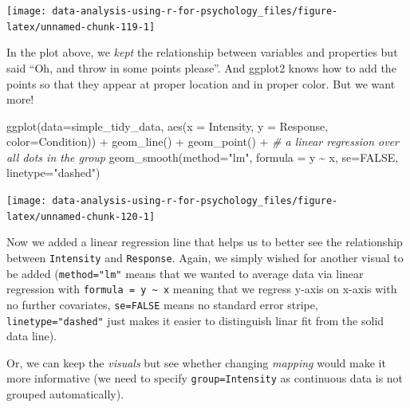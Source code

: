 \documentclass[
]{book}
\newenvironment{Shaded}{\begin{snugshade}}{\end{snugshade}}
\newcommand{\AttributeTok}[1]{\textcolor[rgb]{0.77,0.63,0.00}{#1}}
\newcommand{\CommentTok}[1]{\textcolor[rgb]{0.56,0.35,0.01}{\textit{#1}}}
\newcommand{\ConstantTok}[1]{\textcolor[rgb]{0.00,0.00,0.00}{#1}}
\newcommand{\FunctionTok}[1]{\textcolor[rgb]{0.00,0.00,0.00}{#1}}
\newcommand{\NormalTok}[1]{#1}
\newcommand{\SpecialCharTok}[1]{\textcolor[rgb]{0.00,0.00,0.00}{#1}}
\newcommand{\StringTok}[1]{\textcolor[rgb]{0.31,0.60,0.02}{#1}}
\begin{document}
\begin{center}\texttt{[image: data-analysis-using-r-for-psychology\_files/figure-latex/unnamed-chunk-119-1]} \end{center}

In the plot above, we \emph{kept} the relationship between variables and properties but said ``Oh, and throw in some points please''. And ggplot2 knows how to add the points so that they appear at proper location and in proper color. But we want more!

\begin{Shaded}
\begin{Highlighting}[]
\FunctionTok{ggplot}\NormalTok{(}\AttributeTok{data=}\NormalTok{simple\_tidy\_data, }\FunctionTok{aes}\NormalTok{(}\AttributeTok{x =}\NormalTok{ Intensity, }\AttributeTok{y =}\NormalTok{ Response, }\AttributeTok{color=}\NormalTok{Condition)) }\SpecialCharTok{+} 
  \FunctionTok{geom\_line}\NormalTok{() }\SpecialCharTok{+}
  \FunctionTok{geom\_point}\NormalTok{() }\SpecialCharTok{+}
  \CommentTok{\# a linear regression over all dots in the group}
  \FunctionTok{geom\_smooth}\NormalTok{(}\AttributeTok{method=}\StringTok{"lm"}\NormalTok{, }\AttributeTok{formula =}\NormalTok{ y }\SpecialCharTok{\textasciitilde{}}\NormalTok{ x, }\AttributeTok{se=}\ConstantTok{FALSE}\NormalTok{, }\AttributeTok{linetype=}\StringTok{"dashed"}\NormalTok{) }
\end{Highlighting}
\end{Shaded}

\begin{center}\texttt{[image: data-analysis-using-r-for-psychology\_files/figure-latex/unnamed-chunk-120-1]} \end{center}

Now we added a linear regression line that helps us to better see the relationship between \texttt{Intensity} and \texttt{Response}. Again, we simply wished for another visual to be added (\texttt{method="lm"} means that we wanted to average data via linear regression with \texttt{formula\ =\ y\ \textasciitilde{}\ x} meaning that we regress y-axis on x-axis with no further covariates, \texttt{se=FALSE} means no standard error stripe, \texttt{linetype="dashed"} just makes it easier to distinguish linar fit from the solid data line).

Or, we can keep the \emph{visuals} but see whether changing \emph{mapping} would make it more informative (we need to specify \texttt{group=Intensity} as continuous data is not grouped automatically).
\end{document}
